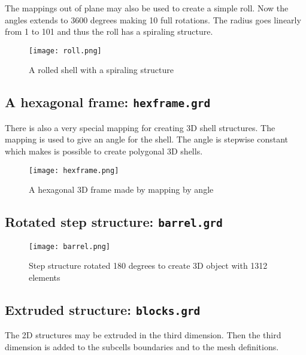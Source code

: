 The mappings out of plane may also be used to create a simple roll.
Now the angles extends to 3600 degrees making 10
full rotations. The radius goes linearly from 1 to 101 and thus the
roll has a spiraling structure.

\begin{figure}
\begin{center}
\texttt{[image: roll.png]}
\end{center}
\caption{A rolled shell with a spiraling structure}
\label{pic11}
\end{figure}




\subsection*{A hexagonal frame: \texttt{hexframe.grd}}

There is also a very special mapping for creating 
3D shell structures. The mapping is used to give an
angle for the shell. The angle is stepwise constant which makes
is possible to create polygonal 3D shells.  

\begin{figure}
\begin{center}
\texttt{[image: hexframe.png]}
\end{center}
\caption{A hexagonal 3D frame made by mapping by angle}
\end{figure}





\subsection*{Rotated step structure: \texttt{barrel.grd}}

\begin{figure}
\begin{center}
\texttt{[image: barrel.png]}
\end{center}
\caption{Step structure rotated 180 degrees to create
      3D object with 1312 elements}
\label{pic9}
\end{figure}




\subsection*{Extruded structure: \texttt{blocks.grd}}
The 2D structures may be extruded in the third dimension. 
Then the third dimension is added to the subcells
boundaries and to the mesh definitions.

